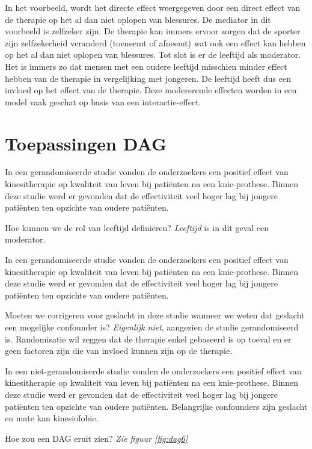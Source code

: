 \documentclass[
]{book}
\theoremstyle{definition}
\theoremstyle{definition}
\theoremstyle{definition}
\theoremstyle{definition}
\theoremstyle{remark}
\begin{document}
In het voorbeeld, wordt het directe effect weergegeven door een direct effect van de therapie op het al dan niet oplopen van blessures. De mediator in dit voorbeeld is zelfzeker zijn. De therapie kan immers ervoor zorgen dat de sporter zijn zelfzekerheid veranderd (toeneemt of afneemt) wat ook een effect kan hebben op het al dan niet oplopen van blessures. Tot slot is er de leeftijd als moderator. Het is immers zo dat mensen met een oudere leeftijd misschien minder effect hebben van de therapie in vergelijking met jongeren. De leeftijd heeft dus een invloed op het effect van de therapie. Deze modererende effecten worden in een model vaak geschat op basis van een interactie-effect.

\hypertarget{toepassingen-dag}{%
\section*{Toepassingen DAG}\label{toepassingen-dag}}


In een gerandomiseerde studie vonden de onderzoekers een positief effect van kinesitherapie op kwaliteit van leven bij patiënten na een knie-prothese. Binnen deze studie werd er gevonden dat de effectiviteit veel hoger lag bij jongere patiënten ten opzichte van oudere patiënten.

Hoe kunnen we de rol van leeftijd definiëren? \emph{Leeftijd} is in dit geval een moderator.

In een gerandomiseerde studie vonden de onderzoekers een positief effect van kinesitherapie op kwaliteit van leven bij patiënten na een knie-prothese. Binnen deze studie werd er gevonden dat de effectiviteit veel hoger lag bij jongere patiënten ten opzichte van oudere patiënten.

Moeten we corrigeren voor geslacht in deze studie wanneer we weten dat geslacht een mogelijke confounder is? \emph{Eigenlijk niet}, aangezien de studie gerandomiseerd is. Randomisatie wil zeggen dat de therapie enkel gebaseerd is op toeval en er geen factoren zijn die van invloed kunnen zijn op de therapie.

In een niet-gerandomiserde studie vonden de onderzoekers een positief effect van kinesitherapie op kwaliteit van leven bij patiënten na een knie-prothese. Binnen deze studie werd er gevonden dat de effectiviteit veel hoger lag bij jongere patiënten ten opzichte van oudere patiënten. Belangrijke confounders zijn geslacht en mate kan kinesiofobie.

Hoe zou een DAG eruit zien? \emph{Zie figuur \ref{fig:dag6}}
\end{document}
